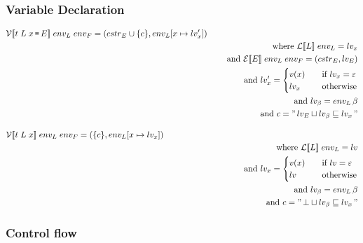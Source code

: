 \subsubsection{Variable Declaration}
\begin{align*}
  & \iV\dblSq{t \; L \; x \tk = E} \; \ienvL \; \ienvF = (\icstr_E \cup \{ c \}, \ienvL[x \mapsto \ilv_x']) \\
  & \seWhere{\iL\dblSq{L} \; \ienvL = \ilv_x} \\
  & \seAnd{\iE\dblSq{E} \; \ienvL \; \ienvF = (\icstr_E, \ilv_E)} \\
  & \seAnd{\ilv_x' = \begin{cases}
  v(x) & \quad \text{if } \ilv_x = \varepsilon \\
  \ilv_x & \quad \text{otherwise}
  \end{cases}} \\
  & \seAnd{\ilv_\ib = \ienvL \, \ib} \\
  & \seAnd{c = \literal{\ilv_E \sqcup \ilv_\ib \sqsubseteq \ilv_x}} \seSpace
  & \iV\dblSq{t \; L \; x} \; \ienvL \; \ienvF = (\{ c \}, \ienvL[x \mapsto \ilv_x])\\
  & \seWhere{\iL\dblSq{L} \; \ienvL = \ilv} \\
  & \seAnd{\ilv_x = \begin{cases}
  v(x) & \quad \text{if } \ilv = \varepsilon \\
  \ilv & \quad \text{otherwise}
  \end{cases}} \\
  & \seAnd{\ilv_\ib = \ienvL \, \ib} \\
  & \seAnd{c = \literal{\bot \sqcup \ilv_\ib \sqsubseteq \ilv_x}}
\end{align*}

\subsubsection{Control flow}

